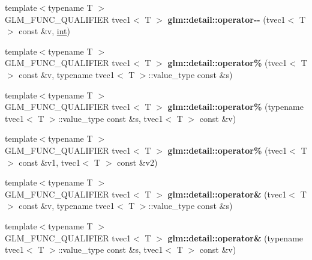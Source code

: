 \begin{DoxyCompactItemize}
\item 
\hypertarget{namespaceglm_1_1detail_a56c5b1a5cb56bbecd799d234d43eec7a}{}{\footnotesize template$<$typename T $>$ }\\G\+L\+M\+\_\+\+F\+U\+N\+C\+\_\+\+Q\+U\+A\+L\+I\+F\+I\+E\+R tvec1$<$ T $>$ {\bfseries glm\+::detail\+::operator-\/-\/} (tvec1$<$ T $>$ const \&v, \hyperlink{_s_d_l__thread_8h_a6a64f9be4433e4de6e2f2f548cf3c08e}{int})\label{namespaceglm_1_1detail_a56c5b1a5cb56bbecd799d234d43eec7a}

\item 
\hypertarget{namespaceglm_1_1detail_afe3345197cfebf3b3c55e2d615776ca6}{}{\footnotesize template$<$typename T $>$ }\\G\+L\+M\+\_\+\+F\+U\+N\+C\+\_\+\+Q\+U\+A\+L\+I\+F\+I\+E\+R tvec1$<$ T $>$ {\bfseries glm\+::detail\+::operator\%} (tvec1$<$ T $>$ const \&v, typename tvec1$<$ T $>$\+::value\+\_\+type const \&s)\label{namespaceglm_1_1detail_afe3345197cfebf3b3c55e2d615776ca6}

\item 
\hypertarget{namespaceglm_1_1detail_acb767b9c9d814e3c3fcbff24c3ad782e}{}{\footnotesize template$<$typename T $>$ }\\G\+L\+M\+\_\+\+F\+U\+N\+C\+\_\+\+Q\+U\+A\+L\+I\+F\+I\+E\+R tvec1$<$ T $>$ {\bfseries glm\+::detail\+::operator\%} (typename tvec1$<$ T $>$\+::value\+\_\+type const \&s, tvec1$<$ T $>$ const \&v)\label{namespaceglm_1_1detail_acb767b9c9d814e3c3fcbff24c3ad782e}

\item 
\hypertarget{namespaceglm_1_1detail_abb8594c67ded240d2a15ba2459a87091}{}{\footnotesize template$<$typename T $>$ }\\G\+L\+M\+\_\+\+F\+U\+N\+C\+\_\+\+Q\+U\+A\+L\+I\+F\+I\+E\+R tvec1$<$ T $>$ {\bfseries glm\+::detail\+::operator\%} (tvec1$<$ T $>$ const \&v1, tvec1$<$ T $>$ const \&v2)\label{namespaceglm_1_1detail_abb8594c67ded240d2a15ba2459a87091}

\item 
\hypertarget{namespaceglm_1_1detail_a4f1e2d9d9ca8fbd5a226683bcbe1a857}{}{\footnotesize template$<$typename T $>$ }\\G\+L\+M\+\_\+\+F\+U\+N\+C\+\_\+\+Q\+U\+A\+L\+I\+F\+I\+E\+R tvec1$<$ T $>$ {\bfseries glm\+::detail\+::operator\&} (tvec1$<$ T $>$ const \&v, typename tvec1$<$ T $>$\+::value\+\_\+type const \&s)\label{namespaceglm_1_1detail_a4f1e2d9d9ca8fbd5a226683bcbe1a857}

\item 
\hypertarget{namespaceglm_1_1detail_a29075e784ca50a7e63be34662cb6c225}{}{\footnotesize template$<$typename T $>$ }\\G\+L\+M\+\_\+\+F\+U\+N\+C\+\_\+\+Q\+U\+A\+L\+I\+F\+I\+E\+R tvec1$<$ T $>$ {\bfseries glm\+::detail\+::operator\&} (typename tvec1$<$ T $>$\+::value\+\_\+type const \&s, tvec1$<$ T $>$ const \&v)\label{namespaceglm_1_1detail_a29075e784ca50a7e63be34662cb6c225}


\end{DoxyCompactItemize}
